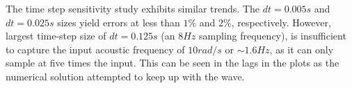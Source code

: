 The time step sensitivity study exhibits similar trends. The $dt=0.005s$ and $dt=0.025s$ sizes yield errors at less than $1\%$ and $2\%$, respectively. However, largest time-step size of $dt=0.125s$ (an $8Hz$ sampling frequency), is insufficient to capture the input acoustic frequency of $10rad/s$ or $\sim1.6Hz$, as it can only sample at five times the input. This can be seen in the lags in the plots as the numerical solution attempted to keep up with the wave.